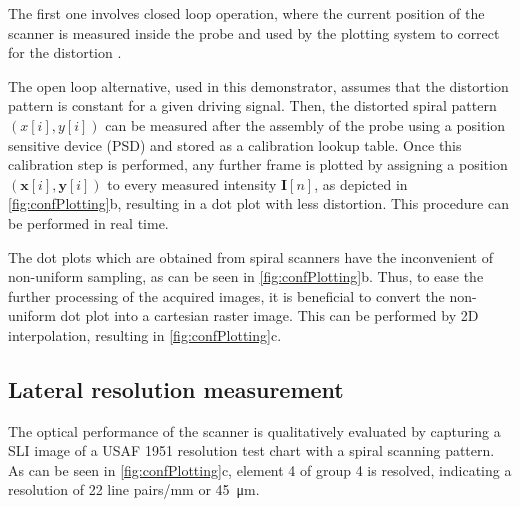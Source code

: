 \documentclass[10pt]{iopart}
\begin{document}
The first one involves closed loop operation, where the current position of the scanner is measured inside the probe and used by the plotting system to correct for the distortion \cite{Yeoh2014}. 

The open loop alternative, used in this demonstrator, assumes that the distortion pattern is constant for a given driving signal. Then, the distorted spiral pattern $(x[i], y[i])$ can be measured after the assembly of the probe using a position sensitive device (PSD) and stored as a calibration lookup table.
Once this calibration step is performed, any further frame is plotted by assigning a position $(\mathbf{x}[i], \mathbf{y}[i])$ to every measured intensity $\mathbf{I}[n]$, as depicted in \autoref{fig:confPlotting}b, resulting in a dot plot with less distortion. This procedure can be performed in real time.

The dot plots which are obtained from spiral scanners have the inconvenient of non-uniform sampling, as can be seen in \autoref{fig:confPlotting}b. Thus, to ease the further processing of the acquired images, it is beneficial to convert the non-uniform dot plot into a cartesian raster image. This can be performed by 2D interpolation, resulting in \autoref{fig:confPlotting}c.


\subsection{Lateral resolution measurement}
The optical performance of the scanner is qualitatively evaluated by capturing a SLI image of a USAF 1951 resolution test chart with a spiral scanning pattern. As can be seen in \autoref{fig:confPlotting}c, element 4 of group 4 is resolved, indicating a resolution of 22 line pairs/mm or \SI{45}{\micro\meter}. 
%
\end{document}

